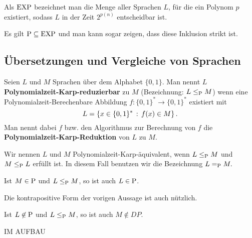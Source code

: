 \begin{defn}
	Als $\operatorname{EXP}$ bezeichnet man die Menge aller Sprachen $L$, für die ein Polynom $p$ existiert, sodass $L$  in der Zeit $2^{p(n)}$ entscheidbar ist. 
\end{defn} 

\begin{bem}
	Es gilt $\operatorname{P}\subseteq \operatorname{EXP}$ und man kann sogar zeigen, dass diese Inklusion strikt ist. 
\end{bem} 

\subsection{Übersetzungen und Vergleiche von Sprachen}

\begin{defn}
	Seien $L$ und $M$ Sprachen über dem Alphabet $\{0,1\}$. Man nennt $L$ \textbf{Polynomialzeit-Karp-reduzierbar} zu $M$ (Bezeichnung: $L \le_{\operatorname{P}} M$) wenn eine Polynomialzeit-Berechenbare Abbildung $f : \{0,1\}^\ast \to \{0,1\}^\ast$ existiert mit 
	\[
		L = \left\{ x \in \{0,1\}^\ast \,:\,  f(x) \in M \right\}.
	\]  
	Man nennt dabei $f$ bzw. den Algorithmus zur Berechnung von $f$ die \textbf{Polynomialzeit-Karp-Reduktion} von $L$ zu $M$. 
	
	Wir nennen $L$ und $M$ Polynomialzeit-Karp-äquivalent, wenn $L \le_{\operatorname{P}} M$ und $M \le_{\operatorname{P}} L$ erfüllt ist. In diesem Fall benutzen wir die Bezeichnung $L  =_{\operatorname{P}} M.$ 
\end{defn} 

\begin{prop}
	Ist $M \in \operatorname{P}$ und $L \le_{\operatorname{P}} M$, so ist auch $L \in \operatorname{P}$. 
\end{prop} 

\begin{bem}
	Die kontrapositive Form der vorigen Aussage ist auch nützlich. 
\end{bem}

\begin{prop}
	Ist $L \not\in \operatorname{P}$ und $L \le_{\operatorname{P}} M$, so ist auch $M \not\in DP$. 
\end{prop} 

IM AUFBAU 

